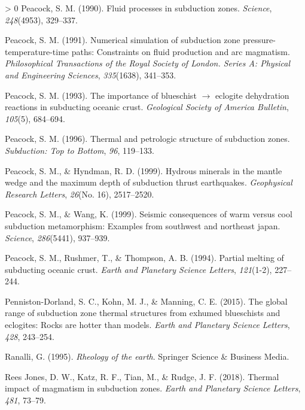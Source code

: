 \documentclass[draft,linenumbers]{agujournal2018}
\newlength{\cslhangindent}
\newenvironment{CSLReferences}[3] %
 {%
  \setlength{\parindent}{0pt}
  \ifodd #1 \everypar{\setlength{\hangindent}{\cslhangindent}}\ignorespaces\fi
  \ifnum #2 > 0
  \setlength{\parskip}{#2\baselineskip}
  \fi
 }%
 {}
\begin{document}
\begin{CSLReferences}{1}{0}
\leavevmode\hypertarget{ref-Peacock1990}{}%
Peacock, S. M. (1990). Fluid processes in subduction zones.
\emph{Science}, \emph{248}(4953), 329--337.

\leavevmode\hypertarget{ref-Peacock1991}{}%
Peacock, S. M. (1991). Numerical simulation of subduction zone
pressure-temperature-time paths: Constraints on fluid production and arc
magmatism. \emph{Philosophical Transactions of the Royal Society of
London. Series A: Physical and Engineering Sciences}, \emph{335}(1638),
341--353.

\leavevmode\hypertarget{ref-Peacock1993}{}%
Peacock, S. M. (1993). The importance of blueschist \(\rightarrow\)
eclogite dehydration reactions in subducting oceanic crust.
\emph{Geological Society of America Bulletin}, \emph{105}(5), 684--694.

\leavevmode\hypertarget{ref-Peacock1996}{}%
Peacock, S. M. (1996). Thermal and petrologic structure of subduction
zones. \emph{Subduction: Top to Bottom}, \emph{96}, 119--133.

\leavevmode\hypertarget{ref-Peacock1999a}{}%
Peacock, S. M., \& Hyndman, R. D. (1999). {Hydrous minerals in the
mantle wedge and the maximum depth of subduction thrust earthquakes}.
\emph{Geophysical Research Letters}, \emph{26}(No. 16), 2517--2520.

\leavevmode\hypertarget{ref-Peacock1999b}{}%
Peacock, S. M., \& Wang, K. (1999). Seismic consequences of warm versus
cool subduction metamorphism: Examples from southwest and northeast
japan. \emph{Science}, \emph{286}(5441), 937--939.

\leavevmode\hypertarget{ref-Peacock1994}{}%
Peacock, S. M., Rushmer, T., \& Thompson, A. B. (1994). Partial melting
of subducting oceanic crust. \emph{Earth and Planetary Science Letters},
\emph{121}(1-2), 227--244.

\leavevmode\hypertarget{ref-Penniston2015}{}%
Penniston-Dorland, S. C., Kohn, M. J., \& Manning, C. E. (2015). The
global range of subduction zone thermal structures from exhumed
blueschists and eclogites: Rocks are hotter than models. \emph{Earth and
Planetary Science Letters}, \emph{428}, 243--254.

\leavevmode\hypertarget{ref-Ranalli1995}{}%
Ranalli, G. (1995). \emph{Rheology of the earth}. Springer Science \&
Business Media.

\leavevmode\hypertarget{ref-ReesJones2018}{}%
Rees Jones, D. W., Katz, R. F., Tian, M., \& Rudge, J. F. (2018).
{Thermal impact of magmatism in subduction zones}. \emph{Earth and
Planetary Science Letters}, \emph{481}, 73--79.


\end{CSLReferences}
\end{document}
